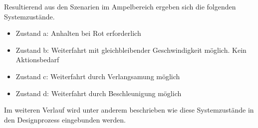 Resultierend aus den Szenarien im Ampelbereich ergeben sich die folgenden Systemzustände.
\begin{itemize}
	\item Zustand a: Anhalten bei Rot erforderlich
	\item Zustand b: Weiterfahrt mit gleichbleibender Geschwindigkeit möglich. Kein Aktionsbedarf
	\item Zustand c: Weiterfahrt durch Verlangsamung möglich
	\item Zustand d: Weiterfahrt durch Beschleunigung möglich
\end{itemize}
Im weiteren Verlauf wird unter anderem beschrieben wie diese Systemzustände in den Designprozess eingebunden werden.
